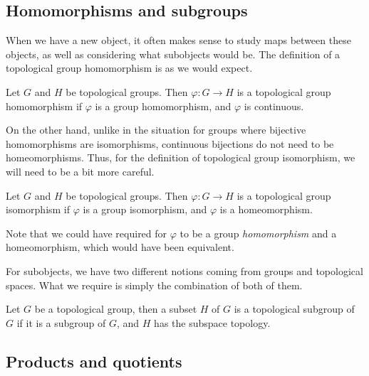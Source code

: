 \documentclass{article}
\begin{document}
    \subsection{Homomorphisms and subgroups}

    When we have a new object, it often makes sense to study maps between these objects, as well as considering what subobjects would be. The definition of a topological group homomorphism is as we would expect.

    \begin{definition}

        Let $G$ and $H$ be topological groups. Then $\varphi : G \to H$ is a topological group homomorphism if $\varphi$ is a group homomorphism, and $\varphi$ is continuous.
    \end{definition}

    On the other hand, unlike in the situation for groups where bijective homomorphisms are isomorphisms, continuous bijections do not need to be homeomorphisms. Thus, for the definition of topological group isomorphism, we will need to be a bit more careful.

    \begin{definition}

        Let $G$ and $H$ be topological groups. Then $\varphi : G \to H$ is a topological group isomorphism if $\varphi$ is a group isomorphism, and $\varphi$ is a homeomorphism.
    \end{definition}

    Note that we could have required for $\varphi$ to be a group \textit{homomorphism} and a homeomorphism, which would have been equivalent.

    For subobjects, we have two different notions coming from groups and topological spaces. What we require is simply the combination of both of them.

    \begin{definition}
        [Subgroup]

        Let $G$ be a topological group, then a subset $H$ of $G$ is a topological subgroup of $G$ if it is a subgroup of $G$, and $H$ has the subspace topology.
    \end{definition}

    \subsection{Products and quotients}
\end{document}
